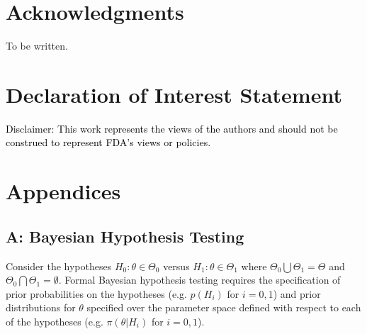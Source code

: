\documentclass[12pt]{article}
\begin{document}
\section*{Acknowledgments}

To be written.

\section*{Declaration of Interest Statement}
\textcolor{black}{Disclaimer: This work represents the views of the authors and should not be construed to represent FDA's views or policies.}

  
 		

\newpage
\section*{Appendices}
\subsection*{A: Bayesian Hypothesis Testing}\label{sec:hypothesis}
Consider the hypotheses $H_0:\theta\in\Theta_{0}$ versus $H_1:\theta\in\Theta_{1}$ where $\Theta_{0}\bigcup \Theta_{1} = \Theta$ and $\Theta_{0} \bigcap \Theta_{1} = \emptyset$.
%
Formal Bayesian hypothesis testing requires the specification of prior probabilities on the hypotheses (e.g. $p(H_i)$ for $i=0,1$)
and prior distributions for $\theta$ specified over the parameter space defined with respect to each of the 
hypotheses (e.g. $\pi(\theta \big| H_i)$ for $i=0,1$). 
%
\end{document}
